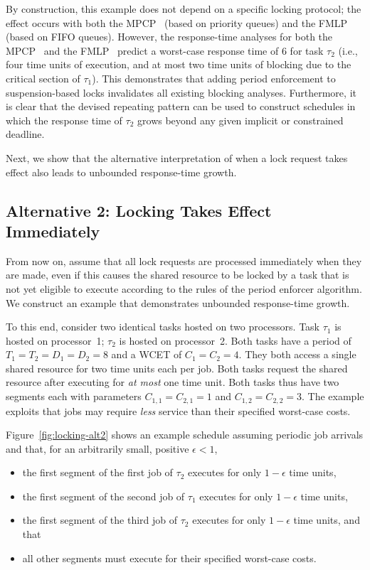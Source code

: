 By construction, this example does not depend on a specific locking protocol; the effect occurs with both the MPCP~\cite{Ra:90} (based on priority queues) and the FMLP~\cite{BLBA:07,BA:08} (based on FIFO queues). However,  the response-time analyses for both the MPCP~\cite{LNR:09,Br:13} and the   FMLP~\cite{Br:13} predict a worst-case response time of $6$ for task $\tau_2$ (i.e., four time units of execution, and at most two time units of blocking due to the critical section of $\tau_1$). This demonstrates that adding period enforcement to suspension-based locks invalidates all existing blocking analyses. Furthermore, it is clear that the devised repeating pattern can be used to construct schedules in which the response time of $\tau_2$  grows beyond any given implicit or constrained deadline.

Next, we show that the alternative interpretation of when a lock request takes effect also leads to unbounded response-time growth.


\subsection{Alternative 2: Locking Takes Effect Immediately}
From now on, assume that all lock requests are processed immediately when they are made, even if this causes the shared resource to be locked by a task that is not yet eligible to execute according to  the rules of the period enforcer algorithm. We construct an example that demonstrates unbounded response-time growth.

To this end, consider two identical tasks hosted on two processors. Task $\tau_1$ is hosted on processor~1; $\tau_2$ is hosted on processor~2. Both tasks have a period of $T_1 = T_2 = D_1 = D_2 = 8$ and a WCET of $C_1 = C_2 = 4$. They both access a single shared resource for two time units each per job. Both tasks request the shared resource after executing for \emph{at most} one time unit. Both tasks thus have two segments each with parameters $C_{1,1} = C_{2,1} = 1$ and $C_{1,2} = C_{2,2} = 3$. The example exploits that jobs may require \emph{less} service than their specified worst-case costs.

Figure~\ref{fig:locking-alt2} shows an example schedule assuming periodic job arrivals and that, for an arbitrarily small, positive $\epsilon <1$,
\begin{itemize}
	\item the first segment of the first job of $\tau_2$ executes for only $1-\epsilon$ time units,
	\item the first segment of the second job of $\tau_1$ executes for only $1-\epsilon$ time units,
	\item the first segment of the third job  of $\tau_2$ executes for only $1-\epsilon$ time units, and that
	\item all other segments must execute for their specified worst-case costs.
\end{itemize}


